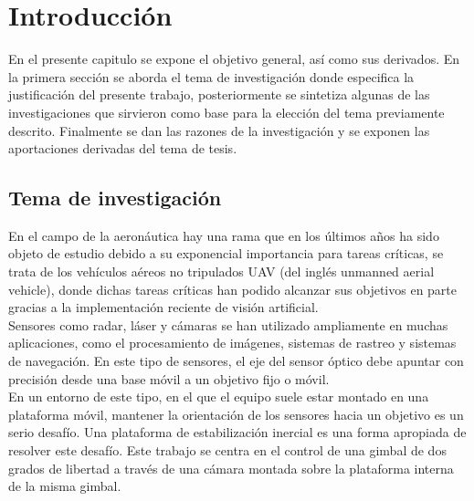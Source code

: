 %

\chapter{Introducción}
\label{sec:intro}



En el presente capitulo se expone el objetivo general, así como sus derivados. En la
primera sección se aborda el tema de investigación donde especifica la justificación del
presente trabajo, posteriormente se sintetiza algunas de las investigaciones que sirvieron
como base para la elección del tema previamente descrito. Finalmente se dan las razones
de la investigación y se exponen las aportaciones derivadas del tema de tesis.

\section{Tema de investigación}
En el campo de la aeronáutica hay una rama que en los últimos años ha sido objeto
de estudio debido a su exponencial importancia para tareas críticas, se trata de los
vehículos aéreos no tripulados UAV (del inglés unmanned aerial vehicle), donde dichas
tareas críticas han podido alcanzar sus objetivos en parte gracias a la implementación
reciente de visión artificial.\\
Sensores como radar, láser y cámaras se han utilizado ampliamente en muchas aplicaciones, como el procesamiento de imágenes, sistemas de rastreo y sistemas de navegación.
En este tipo de sensores, el eje del sensor óptico debe apuntar con precisión desde una base móvil a un objetivo fijo o móvil.\\
En un entorno de este tipo, en el que el equipo suele estar montado en una plataforma móvil, mantener la orientación de los sensores hacia un objetivo es un serio desafío.
Una plataforma de estabilización inercial es una forma apropiada de resolver este desafío.
Este trabajo se centra en el control de una gimbal de dos grados de libertad a través de una cámara montada sobre la plataforma interna de la misma gimbal.

